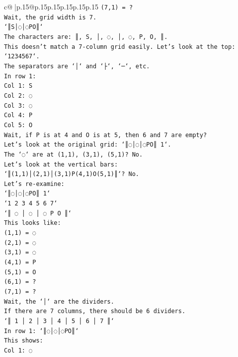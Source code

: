 \documentclass{article}
\begin{document}
{\begin{supertabular}{c@{$\;$}|p{.15\linewidth}@{}p{.15\linewidth}p{.15\linewidth}p{.15\linewidth}p{.15\linewidth}p{.15\linewidth}}
{{{\texttt{(7,1) = ?} \\
\texttt{Wait, the grid width is 7.} \\
\texttt{`║S│◌│◌PO║`} \\
\texttt{The characters are: ║, S, │, ◌, │, ◌, P, O, ║.} \\
\texttt{This doesn't match a 7{-}column grid easily. Let's look at the top: `1234567`.} \\
\texttt{The separators are `│` and `├`, `─`, etc.} \\
\texttt{In row 1:} \\
\texttt{Col 1: S} \\
\texttt{Col 2: ◌} \\
\texttt{Col 3: ◌} \\
\texttt{Col 4: P} \\
\texttt{Col 5: O} \\
\texttt{Wait, if P is at 4 and O is at 5, then 6 and 7 are empty?} \\
\texttt{Let's look at the original grid: `║◌│◌│◌PO║ 1`.} \\
\texttt{The `◌` are at (1,1), (3,1), (5,1)? No.} \\
\texttt{Let's look at the vertical bars:} \\
\texttt{`║(1,1)│(2,1)│(3,1)P(4,1)O(5,1)║`? No.} \\
\texttt{Let's re{-}examine:} \\
\texttt{`║◌│◌│◌PO║ 1`} \\
\texttt{`1 2 3 4 5 6 7`} \\
\texttt{`║ ◌ │ ◌ │ ◌ P O ║`} \\
\texttt{This looks like:} \\
\texttt{(1,1) = ◌} \\
\texttt{(2,1) = ◌} \\
\texttt{(3,1) = ◌} \\
\texttt{(4,1) = P} \\
\texttt{(5,1) = O} \\
\texttt{(6,1) = ?} \\
\texttt{(7,1) = ?} \\
\texttt{Wait, the `│` are the dividers.} \\
\texttt{If there are 7 columns, there should be 6 dividers.} \\
\texttt{`║ 1 │ 2 │ 3 │ 4 │ 5 │ 6 │ 7 ║`} \\
\texttt{In row 1: `║◌│◌│◌PO║`} \\
\texttt{This shows:} \\
\texttt{Col 1: ◌} \\
}}}
\end{supertabular}}
\end{document}
